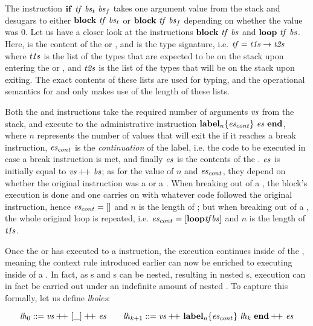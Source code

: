 \documentclass[acmsmall,screen]{acmart}\settopmatter{}
\begin{document}
The instruction \( \mathbf{if}~{\mathit{tf}}~{\mathit{bs}_t}~{\mathit{bs}_f} \) takes one argument value from the stack and desugars to either \( \mathbf{block}~{\mathit{tf}}~{\mathit{bs}_t} \) or \( \mathbf{block}~{\mathit{tf}}~{\mathit{bs}_f} \) depending on whether the value was 0. Let us have a closer look at the instructions \( \mathbf{block}~{\mathit{tf}}~{\mathit{bs}} \) and \( \mathbf{loop}~{\mathit{tf}}~{\mathit{bs}} \). Here,  is the content of the  or , and  is the type signature, i.e. \( \mathit{tf} = \mathit{t1s}\to\mathit{t2s} \) where \( \mathit{t1s} \) is the list of the types that are expected to be on the stack upon entering the  or , and \( \mathit{t2s} \) is the list of the types that will be on the stack upon exiting. The exact contents of these lists are used for typing, and the operational semantics for \xxWblock and \xxWloop only makes use of the length of these lists.

Both the \xxWblock and \xxWloop instructions take the required number of arguments \( \mathit{vs} \) from the stack, and execute to the administrative instruction \( \mathsf{\textbf{label}}_{n}\{\mathit{es}_{cont}\}~\mathit{\mathit{es}}~\mathsf{\textbf{end}} \), where \( n \) represents the number of values that will exit the  if it reaches a break instruction, \( \mathit{es}_{cont} \) is the \emph{continuation} of the label, i.e. the code to be executed in case a break instruction is met, and finally \( \mathit{es} \) is the contents of the . \( \mathit{es} \) is initially equal to \( \mathit{vs}+\kern-0.8ex+\kern0.8ex\mathit{bs} \); as for the value of \( n \) and \( \mathit{es}_{cont} \), they depend on whether the original instruction was a  or a . When breaking out of a , the block's execution is done and one carries on with whatever code followed the original  instruction, hence \( \mathit{es}_{cont} = [] \) and \( n \) is the length of ; but when breaking out of a , the whole original loop is repeated, i.e. \( \mathit{es}_{cont} = [ \mathbf{loop}{\mathit{tf}}{\mathit{bs}} ] \) and \( n \) is the length of \( \mathit{t1s} \). 

Once the  or  has executed to a  instruction, the execution continues inside of the , meaning the context rule introduced earlier can now be enriched to executing inside of a . In fact, as s and s can be nested, resulting in nested s, execution can in fact be carried out under an indefinite amount of nested . To capture this formally, let us define \emph{lholes}:

\[ \mathit{lh}_0 ::= \mathit{vs}+\kern-0.8ex+\kern0.8ex[\_]+\kern-0.8ex+\kern0.8ex\mathit{es}\qquad\mathit{lh}_{k+1}::= \mathit{vs}+\kern-0.8ex+\kern0.8ex\mathsf{\textbf{label}}_{n}\{\mathit{es}_{cont}\}~\mathit{\mathit{lh}_k}~\mathsf{\textbf{end}}+\kern-0.8ex+\kern0.8ex\mathit{es} \]
\end{document}
